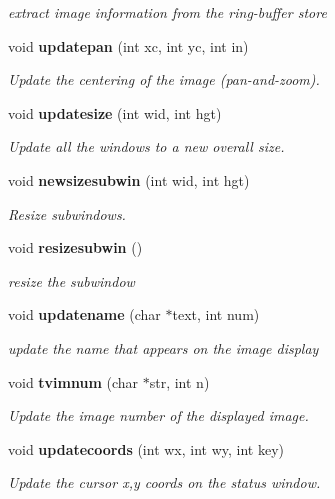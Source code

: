 \begin{CompactItemize}
\begin{CompactList}\small\item\em extract image information from the ring-buffer store \item\end{CompactList}\item 
void {\bf updatepan} (int xc, int yc, int in)
\begin{CompactList}\small\item\em Update the centering of the image (pan-and-zoom). \item\end{CompactList}\item 
void {\bf updatesize} (int wid, int hgt)
\begin{CompactList}\small\item\em Update all the windows to a new overall size. \item\end{CompactList}\item 
void {\bf newsizesubwin} (int wid, int hgt)
\begin{CompactList}\small\item\em Resize subwindows. \item\end{CompactList}\item 
void {\bf resizesubwin} ()
\begin{CompactList}\small\item\em resize the subwindow \item\end{CompactList}\item 
void {\bf updatename} (char $\ast$text, int num)
\begin{CompactList}\small\item\em update the name that appears on the image display \item\end{CompactList}\item 
void {\bf tvimnum} (char $\ast$str, int n)
\begin{CompactList}\small\item\em Update the image number of the displayed image. \item\end{CompactList}\item 
void {\bf updatecoords} (int wx, int wy, int key)
\begin{CompactList}\small\item\em Update the cursor x,y coords on the status window. \item\end{CompactList}\item 

\end{CompactItemize}
